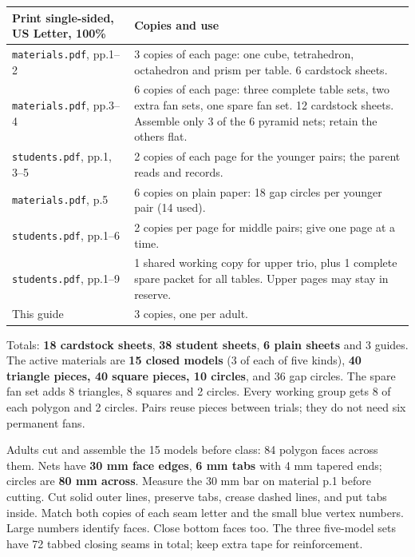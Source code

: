 \documentclass[11pt,letterpaper]{article}
\newcommand{\sub}[1]{\par\vspace{3pt}{\bfseries #1}\par}
\begin{document}
\begin{tabularx}{\linewidth}{|p{4.25cm}|Y|}\hline
Print single-sided, US Letter, 100\% & Copies and use\\\hline
\texttt{materials.pdf}, pp.1--2 & 3 copies of each page: one cube, tetrahedron, octahedron and prism per table. 6 cardstock sheets.\\\hline
\texttt{materials.pdf}, pp.3--4 & 6 copies of each page: three complete table sets, two extra fan sets, one spare fan set. 12 cardstock sheets. Assemble only 3 of the 6 pyramid nets; retain the others flat.\\\hline
\texttt{students.pdf}, pp.1, 3--5 & 2 copies of each page for the younger pairs; the parent reads and records.\\\hline
\texttt{materials.pdf}, p.5 & 6 copies on plain paper: 18 gap circles per younger pair (14 used).\\\hline
\texttt{students.pdf}, pp.1--6 & 2 copies per page for middle pairs; give one page at a time.\\\hline
\texttt{students.pdf}, pp.1--9 & 1 shared working copy for upper trio, plus 1 complete spare packet for all tables. Upper pages may stay in reserve.\\\hline
This guide & 3 copies, one per adult.\\\hline
\end{tabularx}\par\vspace{3pt}
Totals: \textbf{18 cardstock sheets}, \textbf{38 student sheets}, \textbf{6 plain sheets} and 3 guides. The active materials are \textbf{15 closed models} (3 of each of five kinds), \textbf{40 triangle pieces, 40 square pieces, 10 circles}, and 36 gap circles. The spare fan set adds 8 triangles, 8 squares and 2 circles. Every working group gets 8 of each polygon and 2 circles. Pairs reuse pieces between trials; they do not need six permanent fans.

\sub{Cut, crease, close, label}
Adults cut and assemble the 15 models before class: 84 polygon faces across them. Nets have \textbf{30 mm face edges}, \textbf{6 mm tabs} with 4 mm tapered ends; circles are \textbf{80 mm across}. Measure the 30 mm bar on material p.1 before cutting. Cut solid outer lines, preserve tabs, crease dashed lines, and put tabs inside. Match both copies of each seam letter and the small blue vertex numbers. Large numbers identify faces. Close bottom faces too. The three five-model sets have 72 tabbed closing seams in total; keep extra tape for reinforcement.
\end{document}
